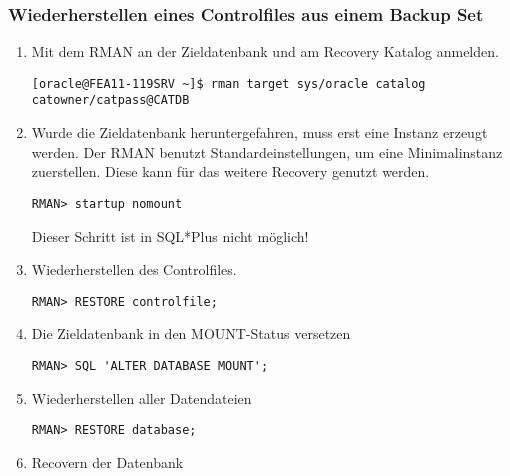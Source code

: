         \subsubsection{Wiederherstellen eines Controlfiles aus einem Backup Set}
          \begin{enumerate}
            \item Mit dem RMAN an der Zieldatenbank und am Recovery Katalog anmelden.
              \begin{lstlisting}[caption={An der Zieldatenbank und am Recovery Katalog anmelden},label=admin1509,language=rman]
[oracle@FEA11-119SRV ~]$ rman target sys/oracle catalog catowner/catpass@CATDB
              \end{lstlisting}
            \item Wurde die Zieldatenbank heruntergefahren, muss erst eine Instanz erzeugt werden. Der RMAN benutzt Standardeinstellungen, um eine Minimalinstanz zuerstellen. Diese kann für das weitere Recovery genutzt werden.
              \begin{lstlisting}[caption={Zieldatenbank im RMAN in den NOMOUNT-Status bringen},label=admin1510,language=rman,alsolanguage=sqlplus]
RMAN> startup nomount
              \end{lstlisting}
              \begin{merke}
                Dieser Schritt ist in SQL*Plus nicht möglich!
              \end{merke}
            \item Wiederherstellen des Controlfiles.
              \begin{lstlisting}[caption={Wiederherstellen des Controlfiles},label=admin1511,language=rman]
RMAN> RESTORE controlfile;
              \end{lstlisting}
            \item Die Zieldatenbank in den MOUNT-Status versetzen
              \begin{lstlisting}[caption={Zieldatenbank mounten},label=admin1512,language=rman,emph={[9]ALTER,DATABASE,MOUNT},emphstyle={[9]\color{magenta}\bfseries}]
RMAN> SQL 'ALTER DATABASE MOUNT';
              \end{lstlisting}
            \item Wiederherstellen aller Datendateien
              \begin{lstlisting}[caption={Datendateien wiederherstellen},label=admin1513,language=rman]
RMAN> RESTORE database;
              \end{lstlisting}
            \item Recovern der Datenbank

\end{enumerate}
